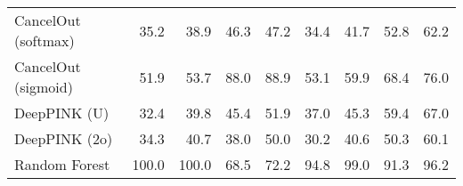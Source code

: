 \begin{table}[h!]
\begin{adjustwidth}{-1.0in}{-1.0in}
{\begin{tabular}{lrrrrrrrr}
CancelOut (softmax) & 35.2 & 38.9 & 46.3 & 47.2 & 34.4 & 41.7 & 52.8 & 62.2 \\
CancelOut (sigmoid) & 51.9 & 53.7 & 88.0 & 88.9 & 53.1 & 59.9 & 68.4 & 76.0 \\
DeepPINK (U) & 32.4 & 39.8 & 45.4 & 51.9 & 37.0 & 45.3 & 59.4 & 67.0 \\
DeepPINK (2o) & 34.3 & 40.7 & 38.0 & 50.0 & 30.2 & 40.6 & 50.3 & 60.1 \\
Random Forest & 100.0 & 100.0 & 68.5 & 72.2 & 94.8 & 99.0 & 91.3 & 96.2 \\
\bottomrule
\end{tabular}}{}
\end{adjustwidth}
\end{table}
